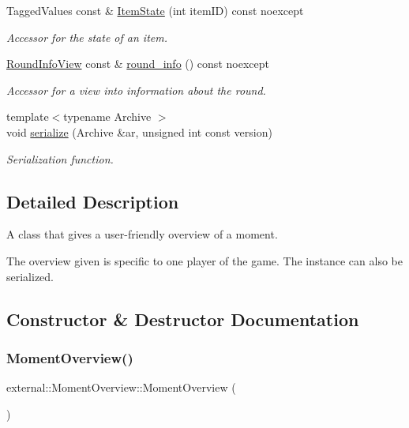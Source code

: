\begin{DoxyCompactItemize}
Tagged\+Values const  \& \hyperlink{classexternal_1_1_moment_overview_a7b4fcaf0941014e26c847fb6dad5912c}{Item\+State} (int item\+ID) const noexcept
\begin{DoxyCompactList}\small\item\em Accessor for the state of an item. \end{DoxyCompactList}\item 
\hyperlink{classroundinfo_1_1_round_info_view}{Round\+Info\+View} const  \& \hyperlink{classexternal_1_1_moment_overview_a186a205fd74b30b627b82bf837b78f79}{round\+\_\+info} () const noexcept
\begin{DoxyCompactList}\small\item\em Accessor for a view into information about the round. \end{DoxyCompactList}\item 
{\footnotesize template$<$typename Archive $>$ }\\void \hyperlink{classexternal_1_1_moment_overview_a5791e663d0c7be6c1a19b0b7af416855}{serialize} (Archive \&ar, unsigned int const version)
\begin{DoxyCompactList}\small\item\em Serialization function. \end{DoxyCompactList}\end{DoxyCompactItemize}


\subsection{Detailed Description}
A class that gives a user-\/friendly overview of a moment. 

The overview given is specific to one player of the game. The instance can also be serialized. 

\subsection{Constructor \& Destructor Documentation}
\mbox{\label{classexternal_1_1_moment_overview_aabe55b10c977be45ba2574c606676c87}} 
\subsubsection{\texorpdfstring{Moment\+Overview()}{MomentOverview()}\hspace{0.1cm}{\footnotesize\ttfamily [1/2]}}
{\footnotesize\ttfamily external\+::\+Moment\+Overview\+::\+Moment\+Overview (\begin{DoxyParamCaption}{ }\end{DoxyParamCaption})\hspace{0.3cm}{\ttfamily [inline]}}



